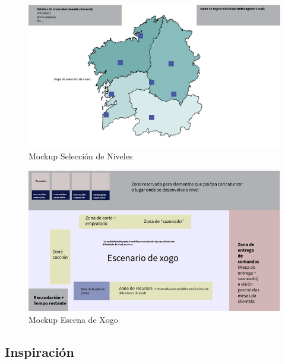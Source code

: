 \documentclass{report}  %
\begin{document}

\begin{figure}[h]
    \centering
    \includegraphics[width=1\textwidth]{images/mockup2.png}
    \caption{Mockup Selección de Niveles}
    \label{fig:Mockup Selección de Niveles}
\end{figure}


\begin{figure}[h]
    \centering
    \includegraphics[width=1\textwidth]{images/mockup3.png}
    \caption{Mockup Escena de Xogo}
    \label{fig:Mockup Escena de Xogo}
\end{figure}

\clearpage
\subsection{Inspiración}
\end{document}
